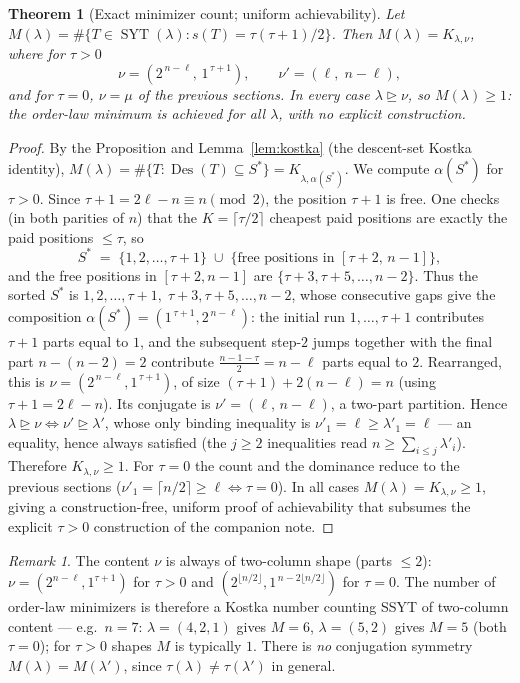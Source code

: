 \documentclass[11pt]{article}
\newtheorem{theorem}{Theorem}
\theoremstyle{remark}
\newtheorem{remark}{Remark}
\newcommand{\Des}{\operatorname{Des}}
\newcommand{\SYT}{\operatorname{SYT}}
\begin{document}
\begin{theorem}[Exact minimizer count; uniform achievability]
Let $M(\lambda)=\#\{T\in\SYT(\lambda):s(T)=\tau(\tau+1)/2\}$. Then $M(\lambda)=K_{\lambda,\nu}$, where for $\tau>0$
\[
\nu=(2^{\,n-\ell},\,1^{\,\tau+1}),\qquad \nu'=(\ell,\;n-\ell),
\]
and for $\tau=0$, $\nu=\mu$ of the previous sections. In every case $\lambda\trianglerighteq\nu$, so $M(\lambda)\ge1$: the order-law minimum is achieved for all $\lambda$, with no explicit construction.
\end{theorem}
\begin{proof}
By the Proposition and Lemma~\ref{lem:kostka} (the descent-set Kostka identity), $M(\lambda)=\#\{T:\Des(T)\subseteq S^{*}\}=K_{\lambda,\alpha(S^{*})}$. We compute $\alpha(S^{*})$ for $\tau>0$. Since $\tau+1=2\ell-n\equiv n\pmod 2$, the position $\tau+1$ is free. One checks (in both parities of $n$) that the $K=\lceil\tau/2\rceil$ cheapest paid positions are exactly the paid positions $\le\tau$, so
\[
S^{*} \;=\; \{1,2,\dots,\tau+1\}\;\cup\;\{\text{free positions in }[\tau+2,\,n-1]\},
\]
and the free positions in $[\tau+2,n-1]$ are $\{\tau+3,\tau+5,\dots,n-2\}$. Thus the sorted $S^{*}$ is $1,2,\dots,\tau+1,\;\tau+3,\tau+5,\dots,n-2$, whose consecutive gaps give the composition $\alpha(S^{*})=(1^{\,\tau+1},2^{\,n-\ell})$: the initial run $1,\dots,\tau+1$ contributes $\tau+1$ parts equal to $1$, and the subsequent step-$2$ jumps together with the final part $n-(n-2)=2$ contribute $\tfrac{n-1-\tau}{2}=n-\ell$ parts equal to $2$. Rearranged, this is $\nu=(2^{\,n-\ell},1^{\,\tau+1})$, of size $(\tau+1)+2(n-\ell)=n$ (using $\tau+1=2\ell-n$). Its conjugate is $\nu'=(\ell,\,n-\ell)$, a two-part partition. Hence $\lambda\trianglerighteq\nu\iff\nu'\trianglerighteq\lambda'$, whose only binding inequality is $\nu'_1=\ell\ge\lambda'_1=\ell$ --- an equality, hence always satisfied (the $j\ge2$ inequalities read $n\ge\sum_{i\le j}\lambda'_i$). Therefore $K_{\lambda,\nu}\ge1$. For $\tau=0$ the count and the dominance reduce to the previous sections ($\nu'_1=\lceil n/2\rceil\ge\ell\iff\tau=0$). In all cases $M(\lambda)=K_{\lambda,\nu}\ge1$, giving a construction-free, uniform proof of achievability that subsumes the explicit $\tau>0$ construction of the companion note.
\end{proof}

\begin{remark}
The content $\nu$ is always of two-column shape (parts $\le 2$): $\nu=(2^{n-\ell},1^{\tau+1})$ for $\tau>0$ and $(2^{\lfloor n/2\rfloor},1^{\,n-2\lfloor n/2\rfloor})$ for $\tau=0$. The number of order-law minimizers is therefore a Kostka number counting SSYT of two-column content --- e.g.\ $n=7$: $\lambda=(4,2,1)$ gives $M=6$, $\lambda=(5,2)$ gives $M=5$ (both $\tau=0$); for $\tau>0$ shapes $M$ is typically $1$. There is \emph{no} conjugation symmetry $M(\lambda)=M(\lambda')$, since $\tau(\lambda)\ne\tau(\lambda')$ in general.
\end{remark}
\end{document}
